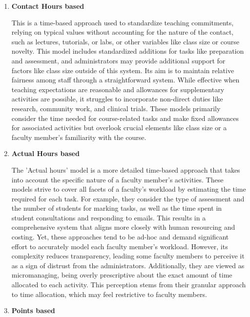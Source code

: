 \begin{enumerate}

  \item \textbf{Contact Hours based}

        This is a time-based approach used to standardize teaching commitments, relying on typical values without accounting for the nature of the contact, such as lectures, tutorials, or labs, or other variables like class size or course novelty. This model includes standardized additions for tasks like preparation and assessment, and administrators may provide additional support for factors like class size outside of this system. Its aim is to maintain relative fairness among staff through a straightforward system. While effective when teaching expectations are reasonable and allowances for supplementary activities are possible, it struggles to incorporate non-direct duties like research, community work, and clinical trials. These models primarily consider the time needed for course-related tasks and make fixed allowances for associated activities but overlook crucial elements like class size or a faculty member's familiarity with the course.

  \item \textbf{Actual Hours based}

        The 'Actual hours' model is a more detailed time-based approach that takes into account the specific nature of a faculty member's activities. These models strive to cover all facets of a faculty's workload by estimating the time required for each task. For example, they consider the type of assessment and the number of students for marking tasks, as well as the time spent in student consultations and responding to emails. This results in a comprehensive system that aligns more closely with human resourcing and costing. Yet, these approaches tend to be ad-hoc and demand significant effort to accurately model each faculty member's workload.  However, its complexity reduces transparency, leading some faculty members to perceive it as a sign of distrust from the administrators. Additionally, they are viewed as micromanaging, being overly prescriptive about the exact amount of time allocated to each activity. This perception stems from their granular approach to time allocation, which may feel restrictive to faculty members.

  \item \textbf{Points based}


\end{enumerate}
